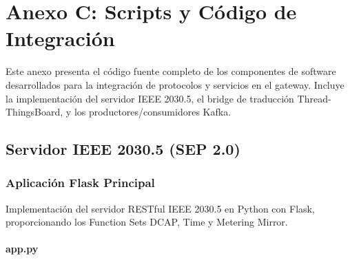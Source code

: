 ﻿\chapter{Anexo C: Scripts y Código de Integración}
\label{anexo:scripts}

Este anexo presenta el código fuente completo de los componentes de software desarrollados para la integración de protocolos y servicios en el gateway. Incluye la implementación del servidor IEEE 2030.5, el bridge de traducción Thread-ThingsBoard, y los productores/consumidores Kafka.

\section{Servidor IEEE 2030.5 (SEP 2.0)}

\subsection{Aplicación Flask Principal}

Implementación del servidor RESTful IEEE 2030.5 en Python con Flask, proporcionando los Function Sets DCAP, Time y Metering Mirror.

\subsubsection{app.py}

